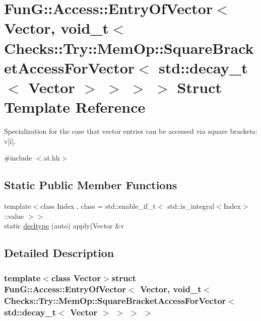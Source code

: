 \hypertarget{structFunG_1_1Access_1_1EntryOfVector_3_01Vector_00_01void__t_3_01Checks_1_1Try_1_1MemOp_1_1Squaa9733f1e90025a89b1e2cfa7d151d247}{\section{\-Fun\-G\-:\-:\-Access\-:\-:\-Entry\-Of\-Vector$<$ \-Vector, void\-\_\-t$<$ \-Checks\-:\-:\-Try\-:\-:\-Mem\-Op\-:\-:\-Square\-Bracket\-Access\-For\-Vector$<$ std\-:\-:decay\-\_\-t$<$ \-Vector $>$ $>$ $>$ $>$ \-Struct \-Template \-Reference}
\label{structFunG_1_1Access_1_1EntryOfVector_3_01Vector_00_01void__t_3_01Checks_1_1Try_1_1MemOp_1_1Squaa9733f1e90025a89b1e2cfa7d151d247}
}


\-Specialization for the case that vector entries can be accessed via square brackets\-: v\mbox{[}i\mbox{]}.  




{\ttfamily \#include $<$at.\-hh$>$}

\subsection*{\-Static \-Public \-Member \-Functions}
\begin{DoxyCompactItemize}
\item 
{\footnotesize template$<$class Index , class  = std\-::enable\-\_\-if\-\_\-t$<$ std\-::is\-\_\-integral$<$\-Index$>$\-::value $>$$>$ }\\static \hyperlink{structFunG_1_1Access_1_1EntryOfVector_3_01Vector_00_01void__t_3_01Checks_1_1Try_1_1MemOp_1_1Squaa9733f1e90025a89b1e2cfa7d151d247_abeef695b85ccc5ee3a0e00d9a4a03f2e}{decltype} (auto) apply(\-Vector \&v
\end{DoxyCompactItemize}


\subsection{\-Detailed \-Description}
\subsubsection*{template$<$class Vector$>$struct Fun\-G\-::\-Access\-::\-Entry\-Of\-Vector$<$ Vector, void\-\_\-t$<$ Checks\-::\-Try\-::\-Mem\-Op\-::\-Square\-Bracket\-Access\-For\-Vector$<$ std\-::decay\-\_\-t$<$ Vector $>$ $>$ $>$ $>$}

